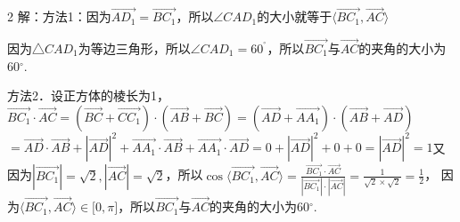 \begin{multicols}{2}
\bindp [详解]解：方法1：因为\(\overrightarrow{AD_{1}} = \overrightarrow{BC_{1}}\)，所以\(\angle CAD_{1}\)的大小就等于\(\langle \overrightarrow{BC_{1}},\overrightarrow{AC} \rangle\)

\bindp 因为△\(CAD_{1}\)为等边三角形，所以\(\angle CAD_{1} = 60^{{^\circ}}\)，所以\(\overrightarrow{BC_{1}}\)与\(\overrightarrow{AC}\)的夹角的大小为\(60{^\circ}\).

\bindp 方法2．设正方体的棱长为1，\(\overrightarrow{BC_{1}} \cdot \overrightarrow{AC} = ( \overrightarrow{BC} + \overrightarrow{CC_{1}} ) \cdot ( \overrightarrow{AB} + \overrightarrow{BC} ) = ( \overrightarrow{AD} + \overrightarrow{AA_{1}} ) \cdot ( \overrightarrow{AB} + \overrightarrow{AD} )\)\allowbreak\(= \overrightarrow{AD} \cdot \overrightarrow{AB} + | \overrightarrow{AD} |^{2} + \overrightarrow{AA_{1}} \cdot \overrightarrow{AB} + \overrightarrow{AA_{1}} \cdot \overrightarrow{AD} = 0 + | \overrightarrow{AD} |^{2} + 0 + 0 = | \overrightarrow{AD} |^{2} = 1\)又因为\(| \overrightarrow{BC_{1}} | = \sqrt{2},| \overrightarrow{AC} | = \sqrt{2}\)，所以\(\cos\langle \overrightarrow{BC_{1}},\overrightarrow{AC} \rangle = \frac{\overrightarrow{BC_{1}} \cdot \overrightarrow{AC}}{| \overrightarrow{BC_{1}} | \cdot | \overrightarrow{AC} |} = \frac{1}{\sqrt{2} \times \sqrt{2}} = \frac{1}{2}\)，
因为\(\langle \overrightarrow{BC_{1}},\overrightarrow{AC} \rangle \in \lbrack 0,\pi\rbrack\)，所以\(\overrightarrow{BC_{1}}\)与\(\overrightarrow{AC}\)的夹角的大小为\(60{^\circ}\).








\end{multicols}
